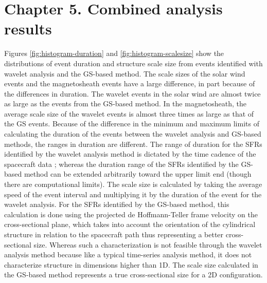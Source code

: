 \chapter{Chapter 5. Combined analysis results}
Figures \ref{fig:histogram-duration} and \ref{fig:histogram-scalesize} show the distributions of event duration and structure scale size from events identified with wavelet analysis and the GS-based method. The scale sizes of the solar wind events and the magnetosheath events have a large difference, in part because of the differences in duration. The wavelet events in the solar wind are almost twice as large as the events from the GS-based method. In the magnetosheath, the average scale size of the wavelet events is almost three times as large as that of the GS events. Because of the difference in the minimum and maximum limits of calculating the duration of the events between the wavelet analysis and GS-based methods, the ranges in duration are different. The range of duration for the SFRs identified by the wavelet analysis method is dictated by the time cadence of the spacecraft data \citep{Torrence:1998}; whereas the duration range of the SFRs identified by the GS-based method can be extended arbitrarily toward the upper limit end (though there are computational limits). The scale size is calculated by taking the average speed of the event interval and multiplying it by the duration of the event for the wavelet analysis. For the SFRs identified by the GS-based method, this calculation is done using the projected de Hoffmann-Teller frame velocity on the cross-sectional plane, which takes into account the orientation of the cylindrical structure in relation to the spacecraft path thus representing a better cross-sectional size. Whereas such a characterization is not feasible through the wavelet analysis method because like a typical time-series analysis method, it does not characterize structure in dimensions higher than 1D. The scale size calculated in the GS-based method represents a true cross-sectional size for a 2D configuration. 
